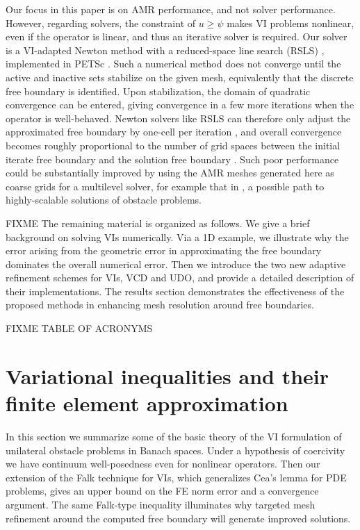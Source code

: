 \documentclass[]{interact}
\theoremstyle{plain}%
\theoremstyle{definition}
\theoremstyle{remark}
\begin{document}
Our focus in this paper is on AMR performance, and not solver performance.  However, regarding solvers, the constraint of $u \geq \psi$ makes VI problems nonlinear, even if the operator is linear, and thus an iterative solver is required.  Our solver is a VI-adapted Newton method with a reduced-space line search (RSLS) \cite{BensonMunson2006}, implemented in PETSc \cite{petsc-user-ref}.  Such a numerical method does not converge until the active and inactive sets stabilize on the given mesh, equivalently that the discrete free boundary is identified.  Upon stabilization, the domain of quadratic convergence can be entered, giving convergence in a few more iterations when the operator is well-behaved.  Newton solvers like RSLS can therefore only adjust the approximated free boundary by one-cell per iteration \citep{GraeserKornhuber2009}, and overall convergence becomes roughly proportional to the number of grid spaces between the initial iterate free boundary and the solution free boundary \citep{Bueler2021}.  Such poor performance could be substantially improved by using the AMR meshes generated here as coarse grids for a multilevel solver, for example that in \cite{BuelerFarrell2024}, a possible path to highly-scalable solutions of obstacle problems.

FIXME The remaining material is organized as follows.  We give a brief background on solving VIs numerically.  Via a 1D example, we illustrate why the error arising from the geometric error in approximating the free boundary dominates the overall numerical error.   Then we introduce the two new adaptive refinement schemes for VIs, VCD and UDO, and provide a detailed description of their implementations.  The results section demonstrates the effectiveness of the proposed methods in enhancing mesh resolution around free boundaries. 

FIXME TABLE OF ACRONYMS


\section{Variational inequalities and their finite element approximation} \label{sec:vifem}

In this section we summarize some of the basic theory of the VI formulation of unilateral obstacle problems in Banach spaces.  Under a hypothesis of coercivity we have continuum well-posedness even for nonlinear operators.  Then our extension of the Falk \cite{Falk1974} technique for VIs, which generalizes Cea's lemma \cite{ElmanSilvesterWathen2014} for PDE problems, gives an upper bound on the FE norm error and a convergence argument.  The same Falk-type inequality illuminates why targeted mesh refinement around the computed free boundary will generate improved solutions.
\end{document}
